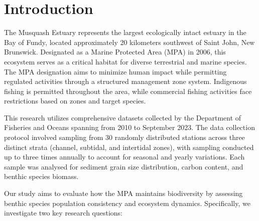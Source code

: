 \documentclass[12pt]{article}
\begin{document}


\newpage
\thispagestyle{empty}
\clearpage
\tableofcontents
\listoffigures
\listoftables
\thispagestyle{empty}
\clearpage
\cleardoublepage
{}





\section{Introduction}

\qquad The Musquash Estuary represents the largest ecologically intact estuary
in the Bay of Fundy, located approximately 20 kilometers southwest of Saint
John, New Brunswick. Designated as a Marine Protected Area (MPA) in 2006, this
ecosystem serves as a critical habitat for diverse terrestrial and marine
species. The MPA designation aims to minimize human impact while permitting
regulated activities through a structured management zone system. Indigenous
fishing is permitted throughout the area, while commercial fishing activities
face restrictions based on zones and target species\cite{DFO2017}.

\qquad This research utilizes comprehensive datasets collected by the Department
of Fisheries and Oceans spanning from 2010 to September 2023. The data collection protocol
involved sampling from 30 randomly distributed stations across three distinct
strata (channel, subtidal, and intertidal zones), with sampling conducted up to
three times annually to account for seasonal and yearly variations. Each sample
was analysed for sediment grain size distribution, carbon
content, and benthic species biomass.

\qquad Our study aims to evaluate how the MPA maintains biodiversity by
assessing benthic species population consistency and ecosystem dynamics.
Specifically, we investigate two key research questions:
\end{document}
